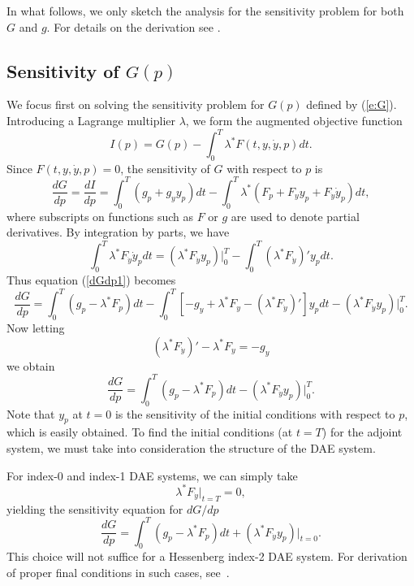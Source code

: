 In what follows, we only sketch the analysis for the sensitivity problem for both $G$ and $g$.
For details on the derivation see \cite{CLPS:03}.

\subsection{Sensitivity of $G(p)$}

We focus first on solving the sensitivity problem for $G(p)$ defined by
(\ref{e:G}).
Introducing a Lagrange multiplier $\lambda$, we form the augmented objective function
$$
I(p) = G(p) - \int_0^T \lambda^*F(t, y,\dot y, p) dt.
$$
Since $F(t, y,\dot y, p)=0$, the sensitivity of $G$ with respect to $p$ is
\begin{equation}\label{dGdp1}
\frac{dG}{dp} = \frac{dI}{dp} 
=\int_0^T(g_p + g_yy_p)dt - \int_0^T \lambda^*( F_p + F_yy_p +
F_{\dot{y}}\dot{y}_p)dt,
\end{equation}
where subscripts on functions such as $F$ or $g$ are used to denote partial derivatives.
By integration by parts, we have 
$$
  \int_0^T \lambda^* F_{\dot{y}} \dot{y}_p dt = 
  (\lambda^* F_{\dot{y}}y_p) |_{0}^{T} 
  - \int_0^T (\lambda^* F_{\dot{y}})'y_p dt.
$$
Thus equation (\ref{dGdp1}) becomes 
\begin{equation}
\frac{dG}{dp} = \int_0^T \left(g_p - \lambda^*F_p \right) dt -  
    \int_0^T \left[-g_y + \lambda^*F_y - (\lambda^*F_{\dot y})'\right]y_p dt
     - (\lambda^* F_{\dot{y}} y_p) |_{0}^{T}.
\end{equation}
Now letting
\begin{equation}\label{e:adj_eqns} 
(\lambda^*F_{\dot{y}})' - \lambda^*F_y = -g_y
\end{equation}
we obtain  
\begin{equation}\label{e:dGdp}
\frac{dG}{dp} = \int_0^T \left(
  g_p - \lambda^*F_p \right) dt 
- (\lambda^* F_{\dot{y}}y_p)|_0^T . 
\end{equation}
Note that $y_p$ at $t=0$ is the sensitivity of the initial conditions
with respect to $p$, which is easily obtained.  To find the initial conditions
(at $t = T$) for the adjoint system, we must take into consideration
the structure of the DAE system.

For index-0 and index-1 DAE systems, we can simply take 
\begin{equation}
\lambda^*F_{\dot y}|_{t=T} = 0,
\label{ad-init1}
\end{equation} 
yielding the sensitivity equation for ${dG}/{dp}$
\begin{equation}
\frac{dG}{dp} = \int_0^T \left(
  g_p - \lambda^*F_p \right) dt 
+ (\lambda^* F_{\dot{y}}y_p)|_{t=0} . 
\label{sensi12}
\end{equation}
This choice will not suffice for a Hessenberg index-2 DAE system. For derivation
of proper final conditions in such cases, see~\cite{CLPS:03}.

